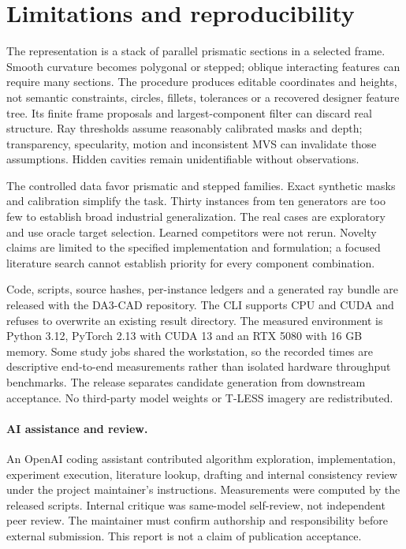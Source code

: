 \documentclass[10pt]{article}
\begin{document}


\section{Limitations and reproducibility}
The representation is a stack of parallel prismatic sections in a selected
frame. Smooth curvature becomes polygonal or stepped; oblique interacting
features can require many sections. The procedure produces editable coordinates
and heights, not semantic constraints, circles, fillets, tolerances or a recovered
designer feature tree. Its finite frame proposals and largest-component filter
can discard real structure. Ray thresholds assume reasonably calibrated masks
and depth; transparency, specularity, motion and inconsistent MVS can invalidate
those assumptions. Hidden cavities remain unidentifiable without observations.

The controlled data favor prismatic and stepped families. Exact synthetic masks
and calibration simplify the task. Thirty instances from ten generators are too
few to establish broad industrial generalization. The real cases are exploratory
and use oracle target selection. Learned competitors were not rerun. Novelty
claims are limited to the specified implementation and formulation; a focused
literature search cannot establish priority for every component combination.

Code, scripts, source hashes, per-instance ledgers and a generated ray bundle
are released with the DA3-CAD repository. The CLI supports CPU and CUDA and
refuses to overwrite an existing result directory. The measured environment is
Python 3.12, PyTorch 2.13 with CUDA 13 and an RTX 5080 with 16 GB memory.
Some study jobs shared the workstation, so the recorded times are descriptive
end-to-end measurements rather than isolated hardware throughput benchmarks.
The release separates candidate generation from downstream acceptance. No
third-party model weights or T-LESS imagery are redistributed.

\paragraph{AI assistance and review.}
An OpenAI coding assistant contributed algorithm exploration, implementation,
experiment execution, literature lookup, drafting and internal consistency
review under the project maintainer's instructions. Measurements were computed
by the released scripts. Internal critique was same-model self-review, not
independent peer review. The maintainer must confirm authorship and responsibility
before external submission. This report is not a claim of publication acceptance.
\end{document}

